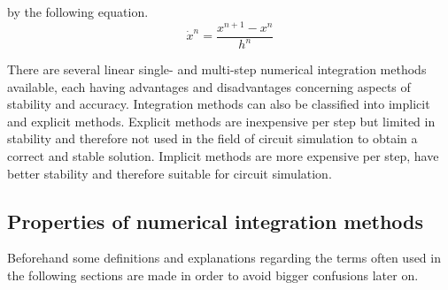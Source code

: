 by the following equation.
\begin{equation}
\dot{x}^n = \dfrac{x^{n+1} - x^{n}}{h^{n}}
\end{equation}

There are several linear single- and multi-step numerical integration
methods available, each having advantages and disadvantages concerning
aspects of stability and accuracy.  Integration methods can also be
classified into implicit and explicit methods.  Explicit methods are
inexpensive per step but limited in stability and therefore not used
in the field of circuit simulation to obtain a correct and stable
solution.  Implicit methods are more expensive per step, have better
stability and therefore suitable for circuit simulation.

\subsection{Properties of numerical integration methods}

Beforehand some definitions and explanations regarding the terms often
used in the following sections are made in order to avoid bigger
confusions later on.

